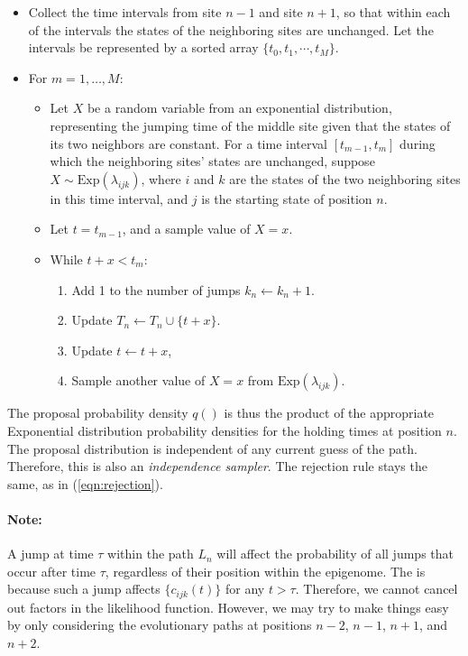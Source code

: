 \documentclass[11pt]{article}
\begin{document}
\begin{itemize}
\item Collect the time intervals from site $n-1$ and site $n+1$, so
  that within each of the intervals the states of the neighboring
  sites are unchanged. Let the intervals be represented by a sorted
  array $\{t_0, t_1, \cdots, t_M\}$.
\item For $m = 1, \ldots, M$:
  \begin{itemize}
  \item Let $X$ be a random variable from an exponential
    distribution, representing the jumping time of the middle site
    given that the states of its two neighbors are constant.  For a time
    interval $[t_{m-1}, t_m]$ during which the neighboring sites' states
    are unchanged, suppose $X\sim \text{Exp}(\lambda_{ijk})$, where $i$
    and $k$ are the states of the two neighboring sites in this time
    interval, and $j$ is the starting state of position $n$.
  \item Let $t = t_{m-1}$, and a sample value of $X=x$.
  \item While $t +x < t_m$:
    \begin{enumerate}[label={(\arabic*)}]
    \item Add 1 to the number of jumps $k_n \leftarrow k_n +1$.
    \item Update $T_n \leftarrow T_n\cup\{t+x\}$.
    \item Update $t \leftarrow  t+x$,
    \item Sample another value of $X=x$ from $\text{Exp}(\lambda_{ijk})$.
    \end{enumerate}
  \end{itemize}
\end{itemize}

The proposal probability density $q()$ is thus the product of the
appropriate Exponential distribution probability densities for the
holding times at position $n$. The proposal distribution is
independent of any current guess of the path. Therefore, this is also
an \textit{independence sampler}. The rejection rule stays the same,
as in (\ref{eqn:rejection}).


\paragraph{Note:} A jump at time $\tau$ within the path $L_{n}$
will affect the probability of all jumps that occur after time $\tau$,
regardless of their position within the epigenome. The is because such
a jump affects $\{c_{ijk}(t)\}$ for any $t > \tau$. Therefore, we
cannot cancel out factors in the likelihood function. However, we may
try to make things easy by only considering the evolutionary paths at
positions $n-2$, $n-1$, $n+1$, and $n+2$.
\end{document}
